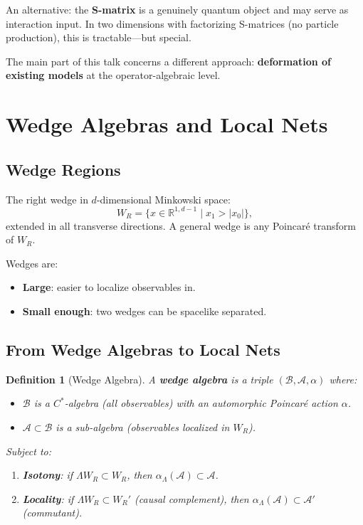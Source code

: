 \documentclass[11pt,a4paper]{article}
\newtheorem{definition}{Definition}[section]
\begin{document}
An alternative: the \textbf{S-matrix} is a genuinely quantum object and
may serve as interaction input. In two dimensions with factorizing S-matrices
(no particle production), this is tractable---but special.

The main part of this talk concerns a different approach: \textbf{deformation
of existing models} at the operator-algebraic level.

\section{Wedge Algebras and Local Nets}

\subsection{Wedge Regions}

The right wedge in $d$-dimensional Minkowski space:
\begin{equation}
  W_R = \{x \in \mathbb{R}^{1,d-1} \mid x_1 > |x_0|\},
\end{equation}
extended in all transverse directions. A general wedge is any Poincar\'e
transform of $W_R$.

Wedges are:
\begin{itemize}[nosep]
  \item \textbf{Large}: easier to localize observables in.
  \item \textbf{Small enough}: two wedges can be spacelike separated.
\end{itemize}

\subsection{From Wedge Algebras to Local Nets}

\begin{definition}[Wedge Algebra]
A \textbf{wedge algebra} is a triple $(\mathcal{B}, \mathcal{A}, \alpha)$
where:
\begin{itemize}[nosep]
  \item $\mathcal{B}$ is a $C^*$-algebra (all observables) with an
        automorphic Poincar\'e action $\alpha$.
  \item $\mathcal{A} \subset \mathcal{B}$ is a sub-algebra (observables
        localized in $W_R$).
\end{itemize}
Subject to:
\begin{enumerate}[nosep]
  \item \textbf{Isotony}: if $\Lambda W_R \subset W_R$, then
        $\alpha_\Lambda(\mathcal{A}) \subset \mathcal{A}$.
  \item \textbf{Locality}: if $\Lambda W_R \subset W_R'$ (causal complement),
        then $\alpha_\Lambda(\mathcal{A}) \subset \mathcal{A}'$ (commutant).
\end{enumerate}
\end{definition}
\end{document}
